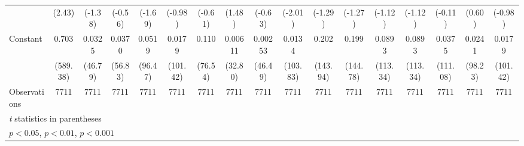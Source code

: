 \begin{table}[htbp]
\begin{tabular}{l*{16}{c}}
                    &      (2.43)         &     (-1.38)         &     (-0.56)         &     (-1.69)         &     (-0.98)         &     (-0.61)         &      (1.48)         &     (-0.63)         &     (-2.01)         &     (-1.29)         &     (-1.27)         &     (-1.12)         &     (-1.12)         &     (-0.11)         &      (0.60)         &     (-0.98)         \\
\addlinespace
Constant            &       0.703\sym{***}&      0.0325\sym{***}&      0.0370\sym{***}&      0.0519\sym{***}&      0.0179\sym{***}&       0.110\sym{***}&     0.00611\sym{***}&     0.00253\sym{***}&      0.0134\sym{***}&       0.202\sym{***}&       0.199\sym{***}&      0.0893\sym{***}&      0.0893\sym{***}&      0.0375\sym{***}&      0.0241\sym{***}&      0.0179\sym{***}\\
                    &    (589.38)         &     (46.79)         &     (56.83)         &     (96.47)         &    (101.42)         &     (76.54)         &     (32.80)         &     (46.49)         &    (103.83)         &    (143.94)         &    (144.78)         &    (113.34)         &    (113.34)         &    (111.08)         &     (98.23)         &    (101.42)         \\
\midrule
Observations        &        7711         &        7711         &        7711         &        7711         &        7711         &        7711         &        7711         &        7711         &        7711         &        7711         &        7711         &        7711         &        7711         &        7711         &        7711         &        7711         \\
\bottomrule
\multicolumn{17}{l}{\footnotesize \textit{t} statistics in parentheses}\\
\multicolumn{17}{l}{\footnotesize \sym{*} \(p<0.05\), \sym{**} \(p<0.01\), \sym{***} \(p<0.001\)}\\
\end{tabular}
\end{table}

